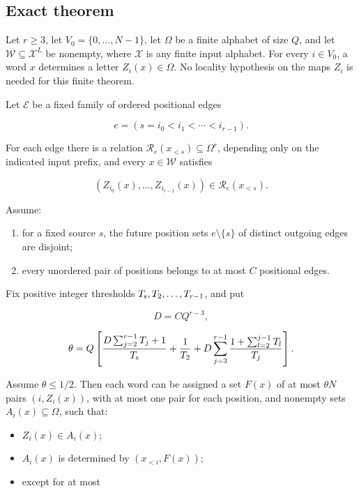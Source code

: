 
\subsection{Exact theorem}\label{exact-theorem}

Let \(r\ge3\), let \(V_0=\{0,\ldots,N-1\}\), let \(\Omega\) be a finite alphabet of size \(Q\), and let \(\mathcal W\subseteq\mathcal X^L\) be nonempty, where \(\mathcal X\) is any finite input alphabet. For every \(i\in V_0\), a word \(x\) determines a letter \(Z_i(x)\in\Omega\). No locality hypothesis on the maps \(Z_i\) is needed for this finite theorem.

Let \(\mathcal E\) be a fixed family of ordered positional edges

\[
e=(s=i_0<i_1<\cdots<i_{r-1}).
\]

For each edge there is a relation \(\mathcal R_e(x_{<s})\subseteq\Omega^r\), depending only on the indicated input prefix, and every \(x\in\mathcal W\) satisfies

\[
(Z_{i_0}(x),\ldots,Z_{i_{r-1}}(x))\in\mathcal R_e(x_{<s}).
\]

Assume:

\begin{enumerate}
\def\labelenumi{\arabic{enumi}.}
\tightlist
\item
  for a fixed source \(s\), the future position sets \(e\setminus\{s\}\) of distinct outgoing edges are disjoint;
\item
  every unordered pair of positions belongs to at most \(C\) positional edges.
\end{enumerate}

Fix positive integer thresholds \(T_{\rm s},T_2,\ldots,T_{r-1}\), and put

\[
D=CQ^{r-3},
\]

\[
\theta=Q\left[
\frac{D\sum_{j=2}^{r-1}T_j+1}{T_{\rm s}}
+\frac1{T_2}
+D\sum_{j=3}^{r-1}\frac{1+\sum_{l=2}^{j-1}T_l}{T_j}
\right].
\]

Assume \(\theta\le1/2\). Then each word can be assigned a set \(F(x)\) of at most \(\theta N\) pairs \((i,Z_i(x))\), with at most one pair for each position, and nonempty sets \(A_i(x)\subseteq\Omega\), such that:

\begin{itemize}
\tightlist
\item
  \(Z_i(x)\in A_i(x)\);
\item
  \(A_i(x)\) is determined by \((x_{<i},F(x))\);
\item
  except for at most
\end{itemize}

